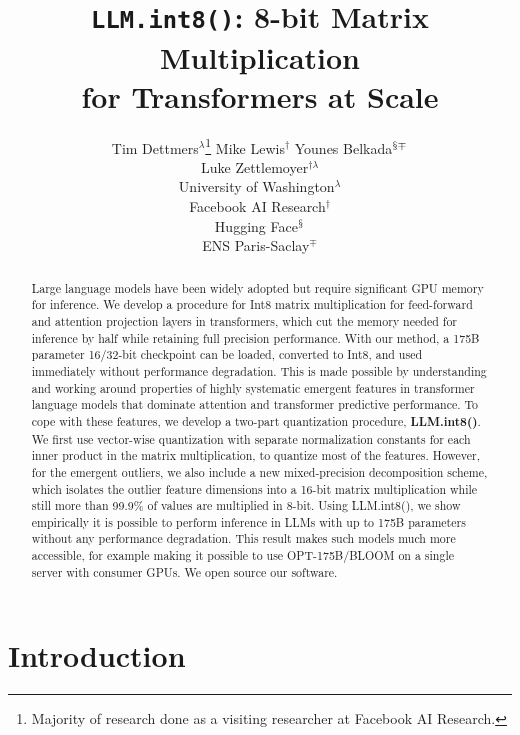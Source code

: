 \documentclass{article}
\title{\texttt{LLM.int8()}: 8-bit Matrix Multiplication \\ for Transformers at Scale}
\author{Tim Dettmers$^{\lambda}$\thanks{Majority of research done as a visiting researcher at Facebook AI Research.} \And Mike Lewis$^\dagger$ \And Younes Belkada$^{\mathsection\mp}$ \\\And Luke Zettlemoyer$^{\dagger\lambda}$
  \AND \\ University of Washington$^\lambda$ \\Facebook AI Research$^\dagger$\\ Hugging Face$^\mathsection$\\ ENS Paris-Saclay$^\mp$
}
\begin{document}
\maketitle

\begin{abstract}
Large language models have been widely adopted but require significant GPU memory for inference. We develop a procedure for Int8 matrix multiplication for feed-forward and attention projection layers in transformers, which cut the memory needed for inference by half while retaining full precision performance. With our method, a 175B parameter 16/32-bit checkpoint can be loaded, converted to Int8, and used immediately without performance degradation. This is made possible by understanding and working around properties of highly systematic emergent features in transformer language models that dominate attention and transformer predictive performance. To cope with these features, we develop a two-part quantization procedure, {\bf LLM.int8()}. We first use vector-wise quantization with separate normalization constants for each inner product in the matrix multiplication, to quantize most of the features. However, for the emergent outliers, we also include a new mixed-precision decomposition scheme, which isolates the outlier feature dimensions into a 16-bit matrix multiplication while still more than 99.9\% of values are multiplied in 8-bit. Using LLM.int8(), we show empirically it is possible to perform inference in LLMs with up to 175B parameters without any performance degradation. This result makes such models much more accessible, for example making it possible to use OPT-175B/BLOOM on a single server with consumer GPUs.
We open source our software.

\end{abstract}

\section{Introduction}
\end{document}

